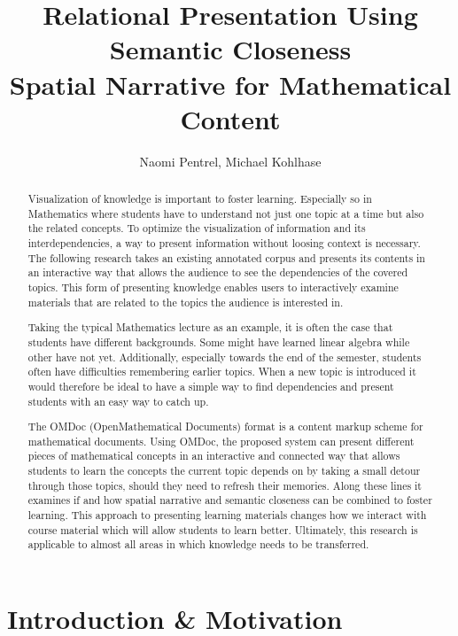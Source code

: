 \documentclass{llncs}
\title{Relational Presentation Using Semantic Closeness\\Spatial Narrative for
  Mathematical Content}
\author{Naomi Pentrel, Michael Kohlhase}
\institute{Jacobs University Bremen}
\begin{document}
\maketitle


 \begin{abstract}
Visualization of knowledge is important to foster learning. Especially so in Mathematics where students have to understand not just one topic at a time but also the related concepts. To optimize the visualization of information and its interdependencies, a way to present information without loosing context is necessary. The following research takes an existing annotated corpus and presents its contents in an interactive way that allows the audience to see the dependencies of the covered topics. This form of presenting knowledge enables users to interactively examine materials that are related to the topics the audience is interested in.

Taking the typical Mathematics lecture as an example, it is often the case that students have different backgrounds. Some might have learned linear algebra while other have not yet. Additionally, especially towards the end of the semester, students often have difficulties remembering earlier topics. When a new topic is introduced it would therefore be ideal to have a simple way to find dependencies and present students with an easy way to catch up.

The OMDoc (OpenMathematical Documents) format is a content markup scheme for mathematical documents. Using OMDoc, the proposed system can present different pieces of mathematical concepts in an interactive and connected way that allows students to learn the concepts the current topic depends on by taking a small detour through those topics, should they need to refresh their memories. Along these lines it examines if and how spatial narrative and semantic closeness can be combined to foster learning. This approach to presenting learning materials changes how we interact with course material which will allow students to learn better. Ultimately, this research is applicable to almost all areas in which knowledge needs to be transferred.
\end{abstract}

\section{Introduction \& Motivation}
\label{sec:introduction}
\end{document}
